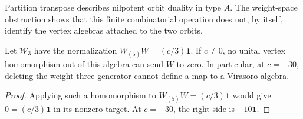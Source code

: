 Partition transpose describes nilpotent orbit duality in type $A$.
The weight-space obstruction shows that this finite combinatorial operation does not, by itself, identify the vertex algebras attached to the two orbits.

\begin{proposition}\label{prop:cbc28-truncation}
Let $\mathcal W_3$ have the normalization $W_{(5)}W=(c/3)\mathbf1$.
If $c\ne0$, no unital vertex homomorphism out of this algebra can send $W$ to zero.
In particular, at $c=-30$, deleting the weight-three generator cannot define a map to a Virasoro algebra.
\end{proposition}
\begin{proof}
Applying such a homomorphism to $W_{(5)}W=(c/3)\mathbf1$ would give $0=(c/3)\mathbf1$ in its nonzero target.
At $c=-30$, the right side is $-10\mathbf1$.
\end{proof}
